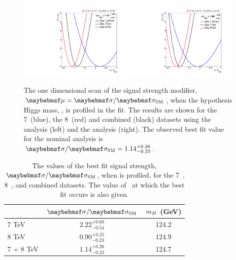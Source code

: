 \begin{figure}
  \includegraphics[width=0.49\textwidth]{results/plots/mva_mu_scan.pdf}
  \includegraphics[width=0.49\textwidth]{results/plots/sideband_mu_scan.pdf}
  \caption[The 1D \NLL scan of the signal strenght modifier $\mu$]{The one dimensional \NLL scan of the signal strength modifier, $\mu=\musm$, when the hypothesis Higgs mass, \mH, is profiled in the fit. The results are shown for the 7~\TeV (blue), the 8~\TeV (red) and combined (black) datasets using the \MFM analysis (left) and the \SMVA analysis (right). The observed best fit value for the nominal \MFM analysis is $\musm=1.14^{+0.26}_{-0.23}$.}
  \label{fig:res_muscan}
\end{figure}

\begin{table}
    \caption{\label{tab:res_mu} The values of the best fit signal
      strength, $\musm$, when \mH is profiled, for the 7~\TeV, 8~\TeV, and combined datasets. 
      The value of \mH\ at which the best fit occurs is also given.
      }
  \begin{center}
    \begin{tabular}{l c c}
      & $\musm$  & $m_{H}$ (GeV)       \\  
      \hline
      \hline
      7 TeV  & $2.22^{+0.60}_{-0.54}$ & 124.2  \\ 
      8 TeV  & $0.90^{+0.25}_{-0.23}$ & 124.9  \\ \hline
      7 + 8 TeV & $1.14^{+0.26}_{-0.23}$ & 124.7  \\ 
    \end{tabular}
    \end{center}
\end{table}

